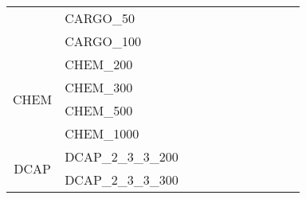 \begin{table}[]
{\begin{tabular}{|c|l|lll|lll|l|l|l|}
			& CARGO\_50                     &                                   &                                 &             &                           &                         &      &                                         &                                 &                                \\
			& CARGO\_100                    &                                   &                                 &             &                           &                         &      &                                         &                                 &                                \\ \hline
			\multirow{4}{*}{CHEM}    & CHEM\_200                     &                                   &                                 &             &                           &                         &      &                                         &                                 &                                \\
			& CHEM\_300                     &                                   &                                 &             &                           &                         &      &                                         &                                 &                                \\
			& CHEM\_500                     &                                   &                                 &             &                           &                         &      &                                         &                                 &                                \\
			& CHEM\_1000                    &                                   &                                 &             &                           &                         &      &                                         &                                 &                                \\ \hline
			\multirow{12}{*}{DCAP}   & DCAP\_2\_3\_3\_200            &                                   &                                 &             &                           &                         &      &                                         &                                 &                                \\
			& DCAP\_2\_3\_3\_300            &                                   &                                 &             &                           &                         &      &                                         &                                 &                                \\

\end{tabular}}
\end{table}
